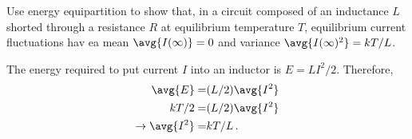 

Use energy equipartition to show that, in a circuit composed of an inductance $L$ shorted through a resistance $R$ at equilibrium temperature $T$, equilibrium current fluctuations hav ea mean $\avg{I(\infty)}=0$ and variance $\avg{I(\infty)^2} = kT/L$.


The energy required to put current $I$ into an inductor is $E = LI^2/2$.
Therefore,
\begin{align*}
  \avg{E} =& (L/2) \avg{I^2} \\
  kT/2 =& (L/2) \avg{I^2} \\
  \to \avg{I^2} =& kT/L \, .
\end{align*}

